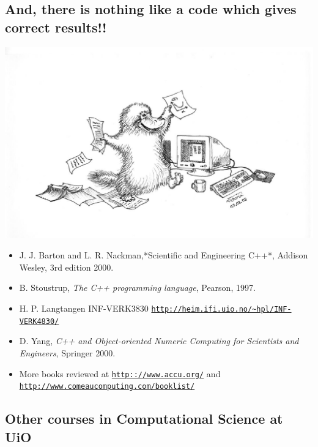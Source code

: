 \documentclass[%
oneside,                 %
final,                   %
10pt]{article}
\begin{document}
\noindent
\subsection*{And, there is nothing like a code which gives correct results!!}



\centerline{\includegraphics[width=0.6\linewidth]{fig-slides/Nebbdyr2.pdf}}



\begin{itemize}
 \item J. J. Barton and L. R. Nackman,*Scientific and Engineering C++*, Addison Wesley, 3rd edition 2000.

 \item B. Stoustrup, \emph{The C++ programming language}, Pearson, 1997.

 \item H. P. Langtangen INF-VERK3830 \href{{http://heim.ifi.uio.no/~hpl/INF-VERK4830/}}{\nolinkurl{http://heim.ifi.uio.no/~hpl/INF-VERK4830/}}

 \item D. Yang, \emph{C++ and Object-oriented Numeric Computing for Scientists and Engineers}, Springer 2000.

 \item More books reviewed at \href{{http:://www.accu.org/}}{\nolinkurl{http:://www.accu.org/}} and \href{{http://www.comeaucomputing.com/booklist/}}{\nolinkurl{http://www.comeaucomputing.com/booklist/}}
\end{itemize}

\noindent
\subsection*{Other courses in Computational Science at UiO}


\end{document}
